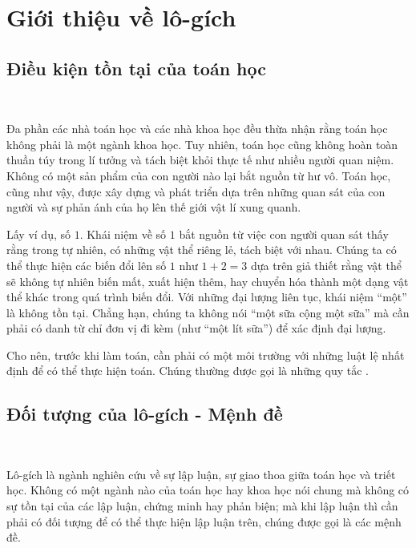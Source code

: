 \section{Giới thiệu về lô-gích}

\subsection{Điều kiện tồn tại của toán học}

\ %

Đa phần các nhà toán học và các nhà khoa học đều thừa nhận rằng toán học không phải là một ngành khoa học. Tuy nhiên, toán học cũng không hoàn toàn thuần túy trong lí tưởng và tách biệt khỏi thực tế như nhiều người quan niệm. Không có một sản phẩm của con người nào lại bắt nguồn từ hư vô. Toán học, cũng như vậy, được xây dựng và phát triển dựa trên những quan sát của con người và sự phản ánh của họ lên thế giới vật lí xung quanh. 

Lấy ví dụ, số $1$. Khái niệm về số $1$ bắt nguồn từ việc con người quan sát thấy rằng trong tự nhiên, có những vật thể riêng lẻ, tách biệt với nhau. Chúng ta có thể thực hiện các biến đổi lên số $1$ như $1 + 2 = 3$ dựa trên giả thiết rằng vật thể sẽ không tự nhiên biến mất, xuất hiện thêm, hay chuyển hóa thành một dạng vật thể khác trong quá trình biến đổi. Với những đại lượng liên tục, khái niệm ``một'' là không tồn tại. Chẳng hạn, chúng ta không nói ``một sữa cộng một sữa'' mà cần phải có danh từ chỉ đơn vị đi kèm (như ``một lít sữa'') để xác định đại lượng. 

Cho nên, trước khi làm toán, cần phải có một môi trường với những luật lệ nhất định để có thể thực hiện toán. Chúng thường được gọi là những quy tắc .

\subsection{Đối tượng của lô-gích - Mệnh đề}

\ %

Lô-gích là ngành nghiên cứu về sự lập luận, sự giao thoa giữa toán học và triết học. Không có một ngành nào của toán học hay khoa học nói chung mà không có sự tồn tại của các lập luận, chứng minh hay phản biện; mà khi lập luận thì cần phải có đối tượng để có thể thực hiện lập luận trên, chúng được gọi là các mệnh đề.

